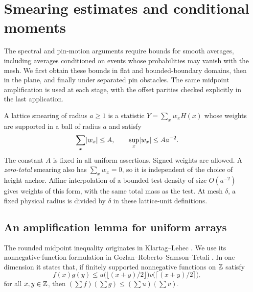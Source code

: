 \section{Smearing estimates and conditional moments}\label{sec:moments}

The spectral and pin-motion arguments require bounds for smooth averages,
including averages conditioned on events whose probabilities may vanish
with the mesh.  We first obtain these bounds in flat and bounded-boundary
domains, then in the plane, and finally under separated pin obstacles.
The same midpoint amplification is used at each stage, with the offset
parities checked explicitly in the last application.

A lattice smearing of radius $a\geq1$ is a statistic
$Y=\sum_x w_xH(x)$ whose weights are supported in a ball of radius $a$
and satisfy
\begin{equation}\label{eq:normalized-weights}
 \sum_x\lvert w_x\rvert\leq A,\qquad
 \sup_x\lvert w_x\rvert\leq A a^{-2}.
\end{equation}
The constant $A$ is fixed in all uniform assertions.  Signed weights are
allowed.  A \emph{zero-total} smearing also has $\sum_xw_x=0$, so it is
independent of the choice of height anchor.  Affine interpolation of a
bounded test density of size $O(a^{-2})$ gives weights of this form, with
the same total mass as the test.  At mesh $\delta$, a fixed physical
radius is divided by $\delta$ in these lattice-unit definitions.

\subsection{An amplification lemma for uniform arrays}

The rounded midpoint inequality originates in
Klartag--Lehec \cite[Theorem~1.4]{KlartagLehec2019}.  We use its
nonnegative-function formulation in
Gozlan--Roberto--Samson--Tetali \cite[Theorem~3]{GRST2019}.
In one dimension it states that, if finitely supported nonnegative
functions on $\mathbb Z$ satisfy
\[
 f(x)g(y)\leq
 u\bigl(\lfloor(x+y)/2\rfloor\bigr)
 v\bigl(\lceil(x+y)/2\rceil\bigr),
\]
for all $x,y\in\mathbb Z$, then $(\sum f)(\sum g)\leq(\sum u)(\sum v)$.

